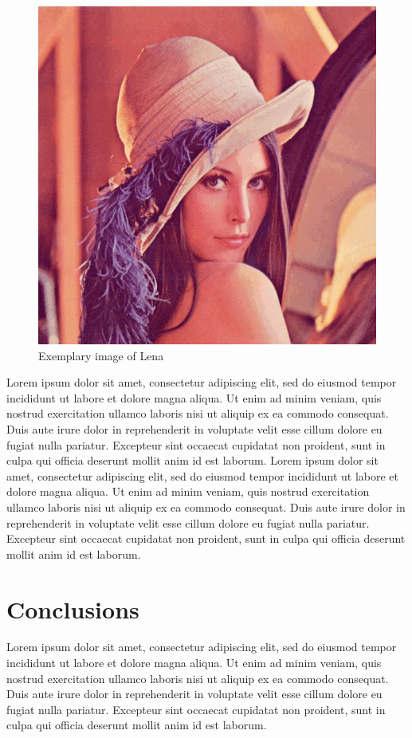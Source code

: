 \documentclass[10pt,twoside,twocolumn,a4paper]{article}
\begin{document}
\begin{figure}
\begin{center}
\includegraphics[width=0.8\linewidth]{img/lena.png} 
\end{center}
\caption{Exemplary image of Lena} \label{fig:lena2}
\end{figure}

Lorem ipsum dolor sit amet, consectetur adipiscing elit, sed do eiusmod tempor incididunt ut labore et dolore magna aliqua. Ut enim ad minim veniam, quis nostrud exercitation ullamco laboris nisi ut aliquip ex ea commodo consequat. Duis aute irure dolor in reprehenderit in voluptate velit esse cillum dolore eu fugiat nulla pariatur. Excepteur sint occaecat cupidatat non proident, sunt in culpa qui officia deserunt mollit anim id est laborum.
Lorem ipsum dolor sit amet, consectetur adipiscing elit, sed do eiusmod tempor incididunt ut labore et dolore magna aliqua. Ut enim ad minim veniam, quis nostrud exercitation ullamco laboris nisi ut aliquip ex ea commodo consequat. Duis aute irure dolor in reprehenderit in voluptate velit esse cillum dolore eu fugiat nulla pariatur. Excepteur sint occaecat cupidatat non proident, sunt in culpa qui officia deserunt mollit anim id est laborum.


\section{Conclusions}
Lorem ipsum dolor sit amet, consectetur adipiscing elit, sed do eiusmod tempor incididunt ut labore et dolore magna aliqua. Ut enim ad minim veniam, quis nostrud exercitation ullamco laboris nisi ut aliquip ex ea commodo consequat. Duis aute irure dolor in reprehenderit in voluptate velit esse cillum dolore eu fugiat nulla pariatur. Excepteur sint occaecat cupidatat non proident, sunt in culpa qui officia deserunt mollit anim id est laborum.
\end{document}
